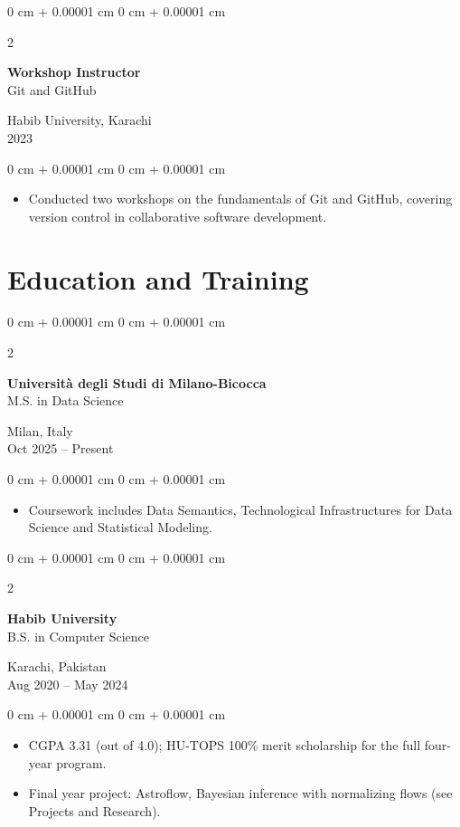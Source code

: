 \documentclass[10pt, letterpaper]{article}
\newenvironment{highlights}{
    \begin{itemize}[
        topsep=0.10 cm,
        parsep=0.10 cm,
        partopsep=0pt,
        itemsep=0pt,
        leftmargin=0 cm + 10pt
    ]
}{
    \end{itemize}
} %
\newenvironment{onecolentry}{
    \begin{adjustwidth}{
        0 cm + 0.00001 cm
    }{
        0 cm + 0.00001 cm
    }
}{
    \end{adjustwidth}
} %
\newenvironment{twocolentry}[2][]{
    \onecolentry
    \def\secondColumn{#2}
    \setcolumnwidth{\fill, 4.5 cm}
    \begin{paracol}{2}
}{
    \switchcolumn \raggedleft \secondColumn
    \end{paracol}
    \endonecolentry
} %
\begin{document}
\vspace{0.2 cm}

\begin{twocolentry}{Habib University, Karachi \\ 2023}
    \textbf{Workshop Instructor} \\
    Git and GitHub
\end{twocolentry}
\begin{onecolentry}
    \begin{highlights}
        \item Conducted two workshops on the fundamentals of Git and GitHub, covering version control in collaborative software development.
    \end{highlights}
\end{onecolentry}

\section{Education and Training}

\begin{twocolentry}{Milan, Italy \\ Oct 2025 -- Present}
    \textbf{Universit\`a degli Studi di Milano-Bicocca} \\
    M.S. in Data Science
\end{twocolentry}
\begin{onecolentry}
    \begin{highlights}
        \item Coursework includes Data Semantics, Technological Infrastructures for Data Science and Statistical Modeling.
    \end{highlights}
\end{onecolentry}

\vspace{0.2 cm}

\begin{twocolentry}{Karachi, Pakistan \\ Aug 2020 -- May 2024}
    \textbf{Habib University} \\
    B.S. in Computer Science
\end{twocolentry}
\begin{onecolentry}
    \begin{highlights}
        \item CGPA 3.31 (out of 4.0); HU-TOPS 100\% merit scholarship for the full four-year program.
        \item Final year project: Astroflow, Bayesian inference with normalizing flows (see Projects and Research).
    \end{highlights}
\end{onecolentry}
\end{document}
